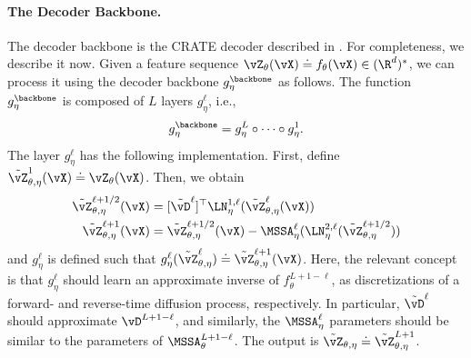 \documentclass[../../book-main.tex]{subfiles}
\begin{document}
\paragraph{The Decoder Backbone.} The decoder backbone is the CRATE
decoder described in . For completeness, we
describe it now. Given a feature sequence \(\vZ_{\theta}(\vX) \doteq
f_{\theta}(\vX) \in (\R^{d})^{*}\), we can process it using the
decoder backbone \(g_{\eta}^{\backbone}\) as follows. The function
\(g_{\eta}^{\backbone}\) is composed of \(L\) layers \(g_{\eta}^{\ell}\), i.e.,
\begin{equation}
g_{\eta}^{\backbone} = g_{\eta}^{L} \circ \cdots \circ g_{\eta}^{1}.
\end{equation}
The layer \(g_{\eta}^{\ell}\) has the following implementation.
First, define \(\tilde{\vZ}_{\theta, \eta}^{1}(\vX) \doteq
\vZ_{\theta}(\vX)\). Then, we obtain
\begin{align}
\tilde{\vZ}_{\theta, \eta}^{\ell + 1/2}(\vX)
&= [\tilde{\vD}^{\ell}]^{\top}\LN_{\eta}^{1,
\ell}(\tilde{\vZ}_{\theta, \eta}^{\ell}(\vX)) \\
\tilde{\vZ}_{\theta, \eta}^{\ell + 1}(\vX)
&= \tilde{\vZ}_{\theta, \eta}^{\ell + 1/2}(\vX) -
\MSSA_{\eta}^{\ell}(\LN_{\eta}^{2, \ell}(\tilde{\vZ}_{\theta,
\eta}^{\ell + 1/2}))
\end{align}
and \(g_{\eta}^{\ell}\) is defined such that
\(g_{\eta}^{\ell}(\tilde{\vZ}_{\theta, \eta}^{\ell}) \doteq
\tilde{\vZ}_{\theta, \eta}^{\ell + 1}(\vX)\). Here, the relevant
concept is that \(g_{\eta}^{\ell}\) should learn an approximate
inverse of \(f_{\theta}^{L + 1 - \ell}\), as discretizations of a
forward- and reverse-time diffusion process, respectively. In
particular, \(\tilde{\vD}^{\ell}\) should approximate \(\vD^{L + 1 -
\ell}\), and similarly, the \(\MSSA_{\eta}^{\ell}\) parameters should
be similar to the parameters of \(\MSSA_{\theta}^{L + 1 - \ell}\).
The output is \(\tilde{\vZ}_{\theta, \eta} \doteq
\tilde{\vZ}_{\theta, \eta}^{L + 1}\).
\end{document}
